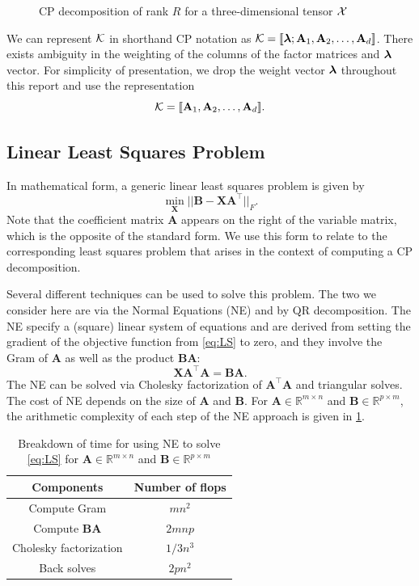 \documentclass{article}
\newcommand{\mat}[1]{\mathbf{#1}}
\newcommand{\V}[2][]{\bm{#1{\mathbf{\MakeLowercase{#2}}}}} 		%
\newcommand{\T}[2][]{#1{\mathbf{\cal{#2}}}} 						%
\begin{document}
\begin{figure}[ht!]
\centering

\caption{CP decomposition of rank $R$ for a three-dimensional tensor $\T{X}$ \label{fig:3d-cp-decomp}}
\end{figure}
We can represent $\T[]{K}$ in shorthand CP notation as $\T{K} = [\![\V{\lambda};\mat{A}_1,\mat{A}_2, \dots,\mat{A}_d ]\!]$. 
There exists ambiguity in the weighting of the columns of the factor matrices and $\V{\lambda}$ vector.
For simplicity of presentation, we drop the weight vector $\V{\lambda}$ throughout this report and use the representation
$$\T{K} = [\![\mat{A}_1,\mat{A}_2, \dots,\mat{A}_d ]\!].$$

\subsection{Linear Least Squares Problem}
\label{sec:LS}

In mathematical form, a generic linear least squares problem is given by 
\begin{equation}
\label{eq:LS}
\min_{\mat{X}}||\mat{B} - \mat{X}\mat{A}^\top||_{F}.
\end{equation}
Note that the coefficient matrix $\mat{A}$ appears on the right of the variable matrix, which is the opposite of the standard form.
We use this form to relate to the corresponding least squares problem that arises in the context of computing a CP decomposition.

Several different techniques can be used to solve this problem.
The two we consider here are via the Normal Equations (NE) and by QR decomposition.
The NE specify a (square) linear system of equations and are derived from setting the gradient of the objective function from \cref{eq:LS} to zero, and they involve the Gram of $\mat{A}$ as well as the product $\mat{B}\mat{A}$:
\begin{equation}
\label{eq:NE}
\mat{X}\mat{A}^\top\mat{A} = \mat{B}\mat{A}.
\end{equation}
The NE can be solved via Cholesky factorization of $\mat{A}^\top\mat{A}$ and triangular solves.
The cost of NE depends on the size of $\mat{A}$ and $\mat{B}$. 
For $\mat{A} \in \mathbb{R}^{m \times n}$ and $\mat{B} \in \mathbb{R}^{p \times m}$, the arithmetic complexity of each step of the NE approach is given in \cref{tab:NE-time}.
\begin{table}[!ht]
  \centering
  \begin{tabular}{|c|c|}
    \hline
    Components & Number of flops\\
    \hline
    Compute Gram & $mn^2$ \\
    Compute $\mat{B}\mat{A}$ & $2mnp$\\
    Cholesky factorization & $1/3n^3$ \\
    Back solves & $2pn^2$ \\
    \hline
  \end{tabular}
  \caption{Breakdown of time for using NE to solve \cref{eq:LS} for $\mat{A} \in \mathbb{R}^{m \times n}$ and $\mat{B} \in \mathbb{R}^{p \times m}$}
  \label{tab:NE-time}
\end{table}
\end{document}
